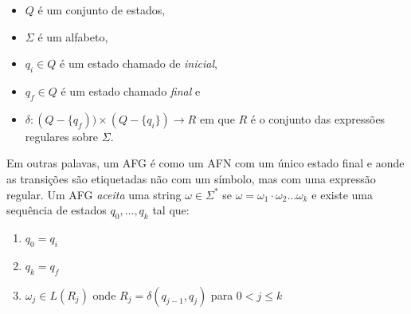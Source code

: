 \begin{itemize}
\item[] $Q$ é um conjunto de estados,
\item[] $\Sigma$ é um alfabeto,
\item[] $q_i \in Q$ é um estado chamado de {\em inicial},
\item[] $q_f \in Q$ é um estado chamado {\em final} e
\item[] $\delta : (Q - \{q_f)) \times (Q - \{q_i\}) \to R$ em que $R$ é o conjunto das expressões regulares sobre $\Sigma$.
\end{itemize}

Em outras palavas, um AFG é como um AFN com um único estado final e aonde as transições são etiquetadas não com um símbolo, mas com uma expressão regular.
Um AFG {\em aceita} uma string $\omega \in \Sigma^*$ se $\omega = \omega_1\cdot \omega_2 \dots \omega_k$ e existe uma sequência de estados $q_0, \dots, q_k$ tal que:
\begin{enumerate}
\item $q_0 = q_i$
\item $q_k = q_f$
\item $\omega_j \in L(R_j)$ onde $R_j = \delta(q_{j-1}, q_j)$ para $0 < j \leq k$
\end{enumerate}

